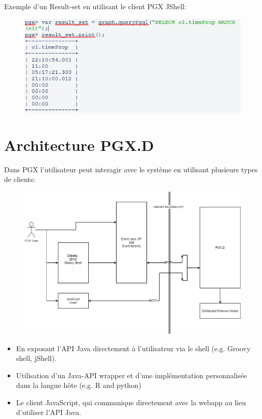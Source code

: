 Exemple d’un Result-set en utilisant le client PGX JShell:\\
\begin{figure}[H]  
  \centering
    \includegraphics[width=1\textwidth]{annexe/Figures/ResultSet.PNG}
\end{figure}

\section{Architecture PGX.D}
Dans PGX l'utilisateur peut interagir avec le système en utilisant plusieurs types de clients:
\begin{figure}[H]  
  \centering
    \includegraphics[width=1\textwidth]{annexe/Figures/PGX-Architecture.png}
\end{figure}

\begin{itemize}[label=\textbullet]
\item En exposant l'API Java directement à l'utilisateur via le shell (e.g. Groovy shell, jShell).
\item Utilisation d'un Java-API wrapper et d'une implémentation personnalisée dans la langue hôte (e.g. R and python)
\item Le client JavaScript, qui communique directement avec la webapp au lieu d'utiliser l'API Java.
\end{itemize}

